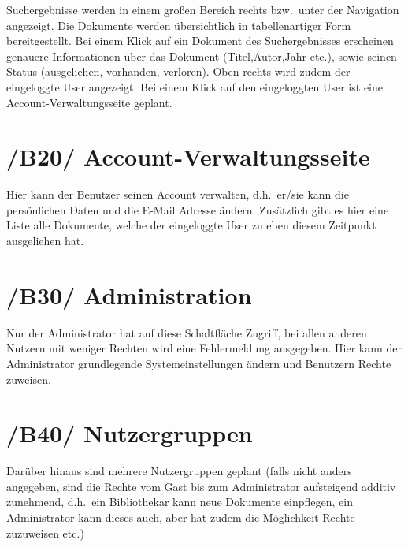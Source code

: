 Suchergebnisse werden in einem großen Bereich rechts bzw.\ unter der Navigation angezeigt. Die Dokumente werden übersichtlich in tabellenartiger Form bereitgestellt. Bei einem Klick auf ein Dokument des Suchergebnisses erscheinen genauere Informationen über das Dokument (Titel,Autor,Jahr etc.), sowie
seinen Status (ausgeliehen, vorhanden, verloren).
Oben rechts wird zudem der eingeloggte User angezeigt.
Bei einem Klick auf den eingeloggten User ist eine Account-Verwaltungsseite geplant.



\section{/B20/ Account-Verwaltungsseite}
  	 	
Hier kann der Benutzer seinen Account verwalten, d.h.\ er/sie kann die persönlichen Daten und die E-Mail Adresse ändern.
Zusätzlich gibt es hier eine Liste alle Dokumente, welche der eingeloggte User zu eben diesem Zeitpunkt ausgeliehen hat.



\section{/B30/ Administration}

Nur der Administrator hat auf diese Schaltfläche Zugriff, bei allen anderen Nutzern mit weniger Rechten wird eine Fehlermeldung ausgegeben.
Hier kann der Administrator grundlegende Systemeinstellungen ändern und Benutzern Rechte zuweisen.



\section{/B40/ Nutzergruppen}

Darüber hinaus sind mehrere Nutzergruppen geplant (falls nicht anders angegeben, sind die Rechte vom Gast bis zum Administrator aufsteigend additiv zunehmend, d.h.\ ein Bibliothekar kann neue Dokumente einpflegen, ein Administrator kann dieses auch, aber hat zudem die Möglichkeit Rechte zuzuweisen etc.) 

